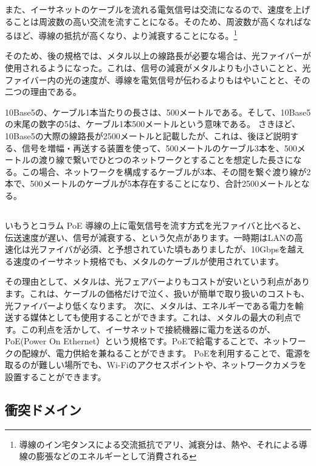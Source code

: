 また、イーサネットのケーブルを流れる電気信号は交流になるので、速度を上げることは周波数の高い交流を流すことになる。そのため、周波数が高くなればなるほど、導線の抵抗が高くなり、より減衰することになる。\footnote{導線のイン宅タンスによる交流抵抗でアリ、減衰分は、熱や、それによる導線の膨張などのエネルギーとして消費される}

そのため、後の規格では、メタル以上の線路長が必要な場合は、光ファイバーが使用されるようになった。これは、信号の減衰がメタルよりも小さいことと、光ファイバー内の光の速度が、導線を電気信号が伝わるよりもはやいことと、その二つの理由である。

10Base5の、ケーブル1本当たりの長さは、500メートルである。そして、10Base5の末尾の数字の5は、ケーブル1本500メートルという意味である。
さきほど、10Base5の大際の線路長が2500メートルと記載したが、これは、後ほど説明する、信号を増幅・再送する装置を使って、500メートルのケーブル3本を、500メートルの渡り線で繋いでひとつのネットワークとすることを想定した長さになる。この場合、ネットワークを構成するケーブルが3本、その間を繋ぐ渡り線が2本で、500メートルのケーブルが5本存在することになり、合計2500メートルとなる。

\subsection*{}
\begin{itembox}[l]{いもうとコラム PoE}
導線の上に電気信号を流す方式を光ファイバと比べると、伝送速度が遅い、信号が減衰する、という欠点があります。一時期はLANの高速化は光ファイバが必須、と予想されていた頃もありましたが、10Gbpsを越える速度のイーサネット規格でも、メタルのケーブルが使用されています。

その理由として、メタルは、光フェアバーよりもコストが安いという利点があります。これは、ケーブルの価格だけで泣く、扱いが簡単で取り扱いのコストも、光ファイバーより低くなります。
次に、メタルは、エネルギーである電力を輸送する媒体としても使用することができます。これは、メタルの最大の利点です。この利点を活かして、イーサネットで接続機器に電力を送るのが、PoE(Power On Ethernet）という規格です。PoEで給電することで、ネットワークの配線が、電力供給を兼ねることができます。
PoEを利用することで、電源を取るのが難しい場所でも、Wi-Fiのアクセスポイントや、ネットワークカメラを設置することができます。


\end{itembox}


\subsection{衝突ドメイン}

